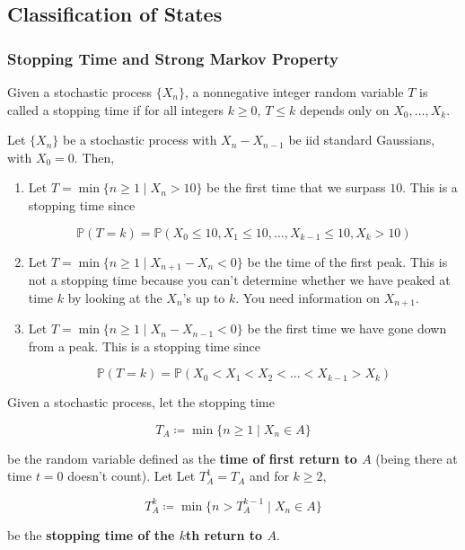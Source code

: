 \documentclass{article}
\begin{document}
  \subsection{Classification of States}

    \subsubsection{Stopping Time and Strong Markov Property}

      \begin{definition}
        Given a stochastic process $\{X_n\}$, a nonnegative integer random variable $T$ is called a stopping time if for all integers $k \geq 0$, $T \leq k$ depends only on $X_0, \ldots, X_k$. 
      \end{definition}

      \begin{example}
        Let $\{X_n\}$ be a stochastic process with $X_n - X_{n - 1}$ be iid standard Gaussians, with $X_0 = 0$. Then, 
        \begin{enumerate}
          \item Let $T = \min\{n \geq 1 \mid X_n > 10\}$ be the first time that we surpass $10$. This is a stopping time since 

            \[\mathbb{P}(T = k) = \mathbb{P}(X_0 \leq 10, X_1 \leq 10, \ldots, X_{k-1} \leq 10, X_{k} > 10)\]
          
          \item Let $T = \min\{n \geq 1 \mid X_{n+1} - X_n < 0\}$ be the time of the first peak. This is not a stopping time because you can't determine whether we have peaked at time $k$ by looking at the $X_n$'s up to $k$. You need information on $X_{n + 1}$. 
          
          \item Let $T = \min\{n \geq 1 \mid X_{n} - X_{n-1} < 0\}$ be the first time we have gone down from a peak. This is a stopping time since 

            \[\mathbb{P}(T = k) = \mathbb{P}(X_0 < X_1 < X_2 < \ldots < X_{k-1} > X_k)\]
        \end{enumerate}
      \end{example}

      \begin{definition}
        Given a stochastic process, let the stopping time 

          \[T_A \coloneqq \min \{ n \geq 1 \mid X_n \in A\}\]

        be the random variable defined as the \textbf{time of first return to $A$} (being there at time $t = 0$ doesn't count). Let 
        Let $T^1_A = T_A$ and for $k \geq 2$, 

          \[T_A^k \coloneqq \min \{ n > T^{k-1}_A \mid X_n \in A\}\]

        be the \textbf{stopping time of the $k$th return to $A$}. 
      \end{definition}
\end{document}
